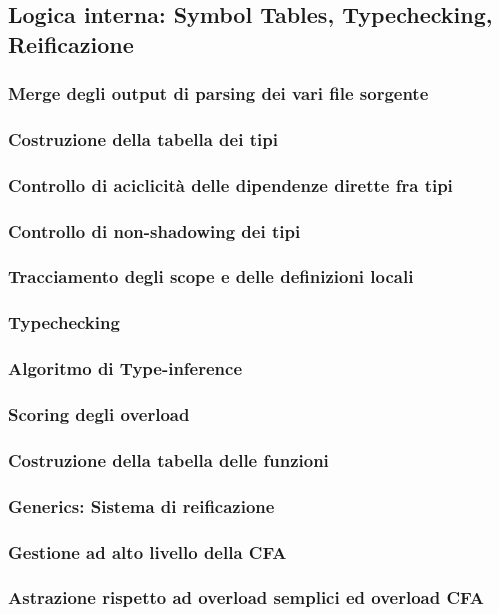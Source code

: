 \subsection{Logica interna: Symbol Tables, Typechecking, Reificazione}

\subsubsection{Merge degli output di parsing dei vari file sorgente}
\subsubsection{Costruzione della tabella dei tipi}
\subsubsection{Controllo di aciclicità delle dipendenze dirette fra tipi}
\subsubsection{Controllo di non-shadowing dei tipi}
\subsubsection{Tracciamento degli scope e delle definizioni locali}
\subsubsection{Typechecking}
\subsubsection{Algoritmo di Type-inference}
\subsubsection{Scoring degli overload}
\subsubsection{Costruzione della tabella delle funzioni}
\subsubsection{Generics: Sistema di reificazione}
\subsubsection{Gestione ad alto livello della CFA}
\subsubsection{Astrazione rispetto ad overload semplici ed overload CFA}
